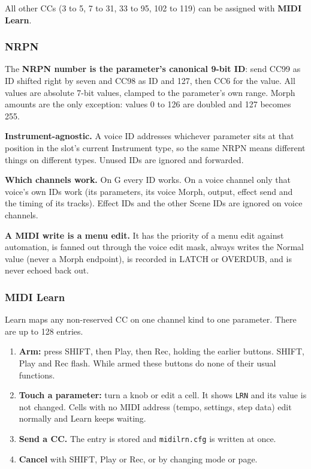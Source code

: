 All other CCs (3 to 5, 7 to 31, 33 to 95, 102 to 119) can be assigned
with \textbf{MIDI Learn}.

\subsubsection{NRPN}\label{nrpn}

The \textbf{NRPN number is the parameter's canonical 9-bit ID}: send
CC99 as ID shifted right by seven and CC98 as ID and 127, then CC6 for
the value. All values are absolute 7-bit values, clamped to the
parameter's own range. Morph amounts are the only exception: values 0 to
126 are doubled and 127 becomes 255.



\textbf{Instrument-agnostic.} A voice ID addresses whichever parameter
sits at that position in the slot's current Instrument type, so the same
NRPN means different things on different types. Unused IDs are ignored
and forwarded.

\textbf{Which channels work.} On G every ID works. On a voice channel
only that voice's own IDs work (its parameters, its voice Morph, output,
effect send and the timing of its tracks). Effect IDs and the other
Scene IDs are ignored on voice channels.

\textbf{A MIDI write is a menu edit.} It has the priority of a menu edit
against automation, is fanned out through the voice edit mask, always
writes the Normal value (never a Morph endpoint), is recorded in LATCH
or OVERDUB, and is never echoed back out.

\subsubsection{MIDI Learn}\label{midi-learn}

Learn maps any non-reserved CC on one channel kind to one parameter.
There are up to 128 entries.

\begin{enumerate}
\def\labelenumi{\arabic{enumi}.}
\tightlist
\item
  \textbf{Arm:} press SHIFT, then Play, then Rec, holding the earlier
  buttons. SHIFT, Play and Rec flash. While armed these buttons do none
  of their usual functions.
\item
  \textbf{Touch a parameter:} turn a knob or edit a cell. It shows
  \texttt{LRN} and its value is not changed. Cells with no MIDI address
  (tempo, settings, step data) edit normally and Learn keeps waiting.
\item
  \textbf{Send a CC.} The entry is stored and \texttt{midilrn.cfg} is
  written at once.
\item
  \textbf{Cancel} with SHIFT, Play or Rec, or by changing mode or page.
\end{enumerate}

